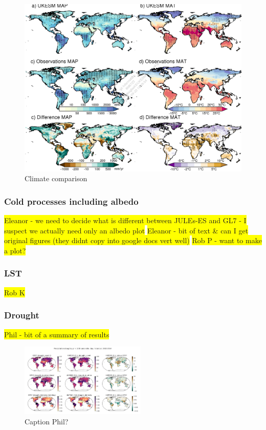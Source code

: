 \documentclass[bg, manuscript]{copernicus}
\newcommand{\hilight}[1]{\colorbox{yellow}{#1}}
\begin{document}
\begin{figure}[t]
    \includegraphics[width=12cm]{figs/Climate/annual_average_clims.png}
    \caption{Climate comparison \label{fig:ClimateAAMaps}}
\end{figure}


\subsubsection{Cold processes including albedo}
\hilight{Eleanor - we need to decide what is different between JULEs-ES and GL7 - I suspect we actually need only an albedo plot}
\hilight{Eleanor - bit of text & can I get original figures (they didnt copy into google docs vert well)}
\hilight{Rob P - want to make a plot?}

\subsubsection{LST}
\hilight{Rob K}

\subsubsection{Drought}
\hilight{Phil - bit of a summary of results}
\begin{figure}[t]
    \includegraphics[width=6cm]{figs/drought.png}
    \caption{Caption Phil? \label{fig:drought} }
\end{figure}
\end{document}
